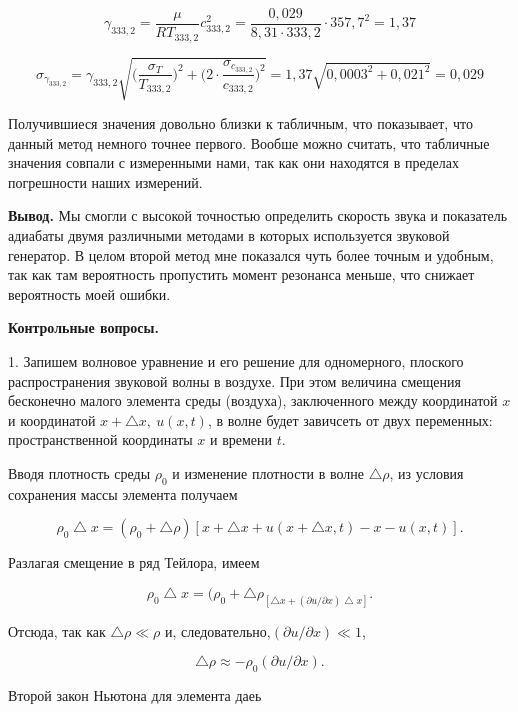 \documentclass[12pt,a4paper]{article}
\begin{document}
\[\gamma_{333,2} = \frac{\mu}{R T_{333,2}}c_{333,2}^2 = \frac{0,029}{8,31 \cdot 333,2} \cdot 357,7^2 = 1,37\] 

\[\sigma_{\gamma_{333,2}} = \gamma_{333,2} \sqrt{\Big( \frac{\sigma_T}{T_{333,2}}\Big)^2 + \Big(2 \cdot \frac{\sigma_{c_{333,2}}}{c_{333,2}} \Big)^2} = 1,37 \sqrt{0,0003^2 + 0,021^2} =  0,029\]

\vspace{0.5cm}
Получившиеся значения довольно близки к табличным, что показывает, что данный метод немного точнее первого. Вообше можно считать, что табличные значения совпали с измеренными нами, так как они находятся в пределах погрешности наших измерений.

\vspace{0.5cm}

\textbf{Вывод.} Мы смогли с высокой точностью определить скорость звука и показатель адиабаты двумя различными методами в которых используется звуковой генератор. В целом второй метод мне показался чуть более точным и удобным, так как там вероятность пропустить момент резонанса меньше, что снижает вероятность моей ошибки.

\vspace{0.5cm}

\textbf{Контрольные вопросы.} 

1. Запишем волновое уравнение и его решение для одномерного, плоского распространения звуковой волны в воздухе. При этом величина смещения бесконечно малого элемента среды (воздуха), заключенного между координатой $x$ и координатой $x + \bigtriangleup x, \: u(x,t)$, в волне будет завичсеть от двух переменных: пространственной координаты $x$ и времени $t$.

Вводя плотность среды $\rho_0$ и изменение плотности в волне $\bigtriangleup \rho$, из условия сохранения массы элемента получаем

\[\rho_0 \bigtriangleup x = (\rho_0 + \bigtriangleup \rho)[x + \bigtriangleup x + u(x + \bigtriangleup x, t) - x - u(x,t)].\]

Разлагая смещение в ряд Тейлора, имеем

\[\rho_0 \bigtriangleup x = (\rho_0 + \bigtriangleup \rho_[\bigtriangleup x + (\partial u/ \partial x)\bigtriangleup x].\]

Отсюда, так как $\bigtriangleup \rho \ll \rho$ и, следовательно,$(\partial u/ \partial x) \ll 1$,

\[\bigtriangleup \rho \approx -\rho_0 (\partial u/ \partial x).\]

Второй закон Ньютона для элемента даеь
\end{document}
